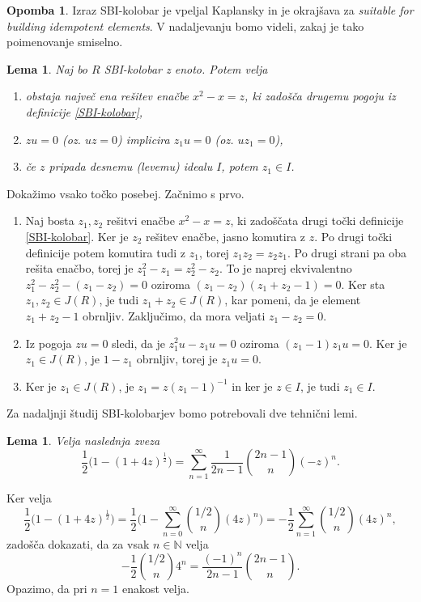\documentclass[a4paper, 12pt]{amsart}
\theoremstyle{definition} %
\newtheorem{opomba}[definicija]{Opomba}
\theoremstyle{plain} %
\newtheorem{lema}[definicija]{Lema}
\newcommand{\N}{\mathbb N}
\begin{document}
\begin{opomba}
Izraz SBI-kolobar je vpeljal Kaplansky in je okrajšava za \textit{suitable for building idempotent elements}. V nadaljevanju bomo videli, zakaj je tako poimenovanje smiselno.
\end{opomba}

\begin{lema}
\label{SBIlastnosti}
Naj bo $R$ SBI-kolobar z enoto. Potem velja
\begin{enumerate}
\item obstaja največ ena rešitev enačbe $x^2 - x = z$, ki zadošča drugemu pogoju iz definicije \ref{SBI-kolobar},
\item $zu = 0$ (oz. $uz = 0$) implicira  $z_1 u = 0$ (oz. $uz_1=0$),
\item če $z$ pripada desnemu (levemu) idealu $I$, potem $z_1\in I$.
\end{enumerate}
\end{lema}

\proof
Dokažimo vsako točko posebej. Začnimo s prvo.
\begin{enumerate}
\item Naj bosta $z_1, z_2$ rešitvi enačbe $x^2 -x = z$, ki zadoščata drugi točki definicije \ref{SBI-kolobar}. Ker je $z_2$ rešitev enačbe, jasno komutira z $z$. Po drugi točki definicije potem komutira tudi z $z_1$, torej $z_1 z_2 = z_2 z_1$. Po drugi strani pa oba rešita enačbo, torej je $z_1^2 - z_1 = z_2^2 - z_2$. To je naprej ekvivalentno $z_1^2 - z_2^2 - (z_1 - z_2) = 0$ oziroma $(z_1 - z_2)(z_1 +z_2 -1)=0$. Ker sta $z_1, z_2\in J(R)$, je tudi $z_1 + z_2 \in J(R)$, kar pomeni, da je element $z_1 + z_2 - 1$ obrnljiv. Zaključimo, da mora veljati $z_1 - z_2 = 0$.
\item Iz pogoja $zu = 0$ sledi, da je $z_1^2 u - z_1 u = 0$ oziroma $(z_1 - 1)z_1 u = 0$. Ker je $z_1\in J(R)$, je $1- z_1$ obrnljiv, torej je $z_1 u = 0$.  
\item Ker je $z_1 \in J(R)$, je $z_1 = z(z_1 - 1)^{-1}$ in ker je $z\in I$, je tudi $z_1 \in I$.
\end{enumerate}
\endproof

Za nadaljnji študij SBI-kolobarjev bomo potrebovali dve tehnični lemi.
\begin{lema}
\label{SBItehnicna1}
Velja naslednja zveza
$$
\frac{1}{2}\big( 1- (1+4z)^{\frac{1}{2}}\big) = \sum_{n=1}^{\infty} \frac{1}{2n-1} \binom{2n-1}{n}(-z)^n.
$$
\end{lema}

\proof
Ker velja 
$$
\frac{1}{2}\big( 1- (1+4z)^{\frac{1}{2}}\big) = \frac{1}{2}\big( 1 - \sum_{n=0}^{\infty} {1/2 \choose n} (4z)^n \big) = -\frac{1}{2} \sum_{n=1}^{\infty} {1/2 \choose n} (4z)^n,
$$
zadošča dokazati, da za vsak $n\in \N$ velja
$$
-\frac{1}{2} {1/2 \choose n} 4^n = \frac{(-1)^n}{2n-1} {2n-1 \choose n}.
$$
Opazimo, da pri $n=1$ enakost velja.
\end{document}
